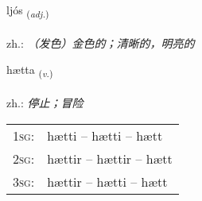 \documentclass[frontgrid, backgrid]{flacards}\usepackage[]{graphicx}\usepackage[]{xcolor}
\begin{document}
\renewcommand{\blhead}{\vskip5pt {\small\bfseries\footnotesize Lýsingarorð | 形容词 }}
\renewcommand{\bcfoot}{\vskip5pt \hspace{2pt}{\small\bfseries\footnotesize 1K}}


{ljós \small{\textsubscript{(\textit{adj.})}} \\[1ex] %
\textphonetic{[ljouːs]} \\
zh.: \emph{（发色）金色的；清晰的，明亮的} \\  [2ex]
\renewcommand*{\arraystretch}{0.8}
}

\renewcommand{\flhead}{\vskip5pt \fboxsep=0pt {\small\bfseries\footnotesize Sagnorð | 动词}}
\renewcommand{\fcfoot}{\vskip5pt \fboxsep=0pt \hspace{2pt}{\small\bfseries\footnotesize 1K}}

\renewcommand{\blhead}{\vskip5pt {\small\bfseries\footnotesize Sagnorð | 动词 }}
\renewcommand{\bcfoot}{\vskip5pt \hspace{2pt}{\small\bfseries\footnotesize 1K}}


{hætta \small{\textsubscript{(\textit{v.})}} \\[1ex] %
\textphonetic{[haihta]} \\
zh.: \emph{停止；冒险} \\  [2ex]
\renewcommand*{\arraystretch}{0.8}
\begin{tabular}{p{1cm}l}
\textsc{1sg}: & hætti -- hætti -- hætt \\ 
\textsc{2sg}: & hættir -- hættir -- hætt \\ 
\textsc{3sg}: & hættir -- hætti -- hætt \\ 
\end{tabular}
}
\end{document}
